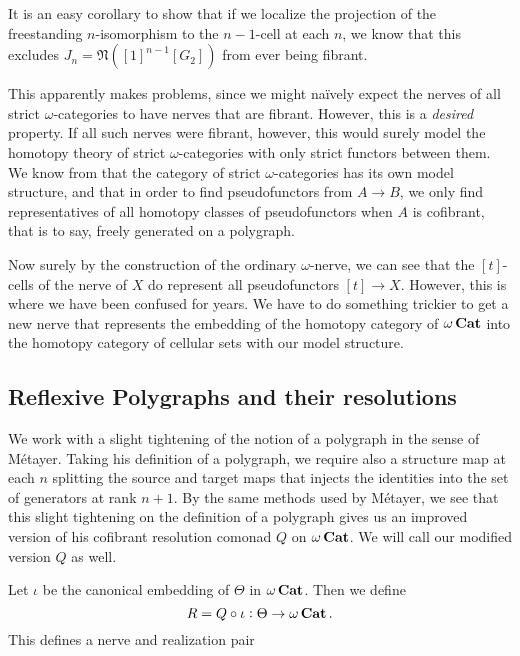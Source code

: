 It is an easy corollary to show that if we localize the projection of the freestanding \(n\)-isomorphism to the \(n-1\)-cell at each \(n\), we know that this excludes \(J_n=\mathfrak{N}([1]^{n-1}[G_2])\) from ever being fibrant.  

This apparently makes problems, since we might na\"ively expect the nerves of all strict \(\omega\)-categories to have nerves that are fibrant.  However, this is a \emph{desired} property.  If all such nerves were fibrant, however, this would surely model the homotopy theory of strict \(\omega\)-categories with only strict functors between them.  We know from \cite{lmw} that the category of strict \(\omega\)-categories has its own model structure, and that in order to find pseudofunctors from \(A\to B\), we only find representatives of all homotopy classes of pseudofunctors when \(A\) is cofibrant, that is to say, freely generated on a polygraph.

Now surely by the construction of the ordinary \(\omega\)-nerve, we can see that the \([t]\)-cells of the nerve of \(X\) do represent all pseudofunctors \([t]\to X\).  However, this is where we have been confused for years.  We have to do something trickier to get a new nerve that represents the embedding of the homotopy category of \(\omega\operatorname{\mathbf{Cat}}\) into the homotopy category of cellular sets with our model structure.

\subsection{Reflexive Polygraphs and their resolutions}
We work with a slight tightening of the notion of a polygraph in the sense of M\'etayer.  Taking his definition of a polygraph, we require also a structure map at each \(n\) splitting the source and target maps that injects the identities into the set of generators at rank \(n+1\).  By the same methods used by M\'etayer, we see that this slight tightening on the definition of a polygraph gives us an improved version of his cofibrant resolution comonad \(Q\) on \(\omega\operatorname{\mathbf{Cat}}\).  We will call our modified version \(Q\) as well.  

Let \(\iota\) be the canonical embedding of \(\Theta\) in \(\omega\operatorname{\mathbf{Cat}}\). Then we define \[R=Q\circ \iota:\Theta\to \omega\operatorname{\mathbf{Cat}}.\]  This defines a nerve and realization pair 


